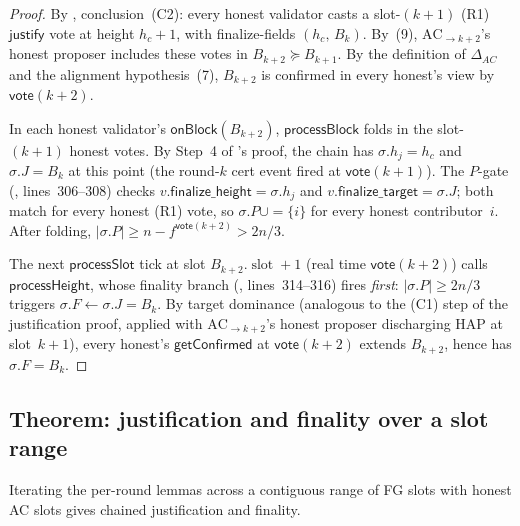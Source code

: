 \ifx\litemode\undefined\documentclass{article}\fi
\newcommand{\slot}[0]{\ensuremath{\operatorname{\mathrm{slot}}}}
\newcommand{\just}{\ensuremath{\mathsf{justify}}\xspace}
\newcommand{\finalizeHeight}{\mathsf{finalize\_height}}
\newcommand{\finalizeTarget}{\mathsf{finalize\_target}}
\newcommand{\vote}{\mathsf{vote}}
\newcommand{\processSlot}{\textsf{processSlot}\xspace}
\newcommand{\processBlock}{\textsf{processBlock}\xspace}
\newcommand{\processHeight}{\textsf{processHeight}\xspace}
\newcommand{\onBlock}{\textsf{onBlock}\xspace}
\newcommand{\getConfirmed}{\textsf{getConfirmed}\xspace}
\theoremstyle{plain}
\theoremstyle{definition}
\theoremstyle{remark}
\begin{document}
\begin{proof}
By , conclusion~\mbox{(C2)}: every honest validator casts a slot-$(k+1)$ \mbox{(R1)} \just vote at height $h_c + 1$, with finalize-fields $(h_c,\, B_k)$. By~(9), $\mathrm{AC}_{\to k+2}$'s honest proposer includes these votes in $B_{k+2} \succeq B_{k+1}$. By the definition of $\Delta_{AC}$ and the alignment hypothesis~(7), $B_{k+2}$ is confirmed in every honest's view by $\vote(k+2)$.

In each honest validator's $\onBlock(B_{k+2})$, $\processBlock$ folds in the slot-$(k+1)$ honest votes. By Step~4 of 's proof, the chain has $\sigma.h_j = h_c$ and $\sigma.J = B_k$ at this point (the round-$k$ cert event fired at $\vote(k+1)$). The $P$-gate (, lines~306--308) checks $v.\finalizeHeight = \sigma.h_j$ and $v.\finalizeTarget = \sigma.J$; both match for every honest \mbox{(R1)} vote, so $\sigma.P \cup= \{i\}$ for every honest contributor~$i$. After folding, $|\sigma.P| \geq n - f^{\vote(k+2)} > 2n/3$.

The next $\processSlot$ tick at slot $B_{k+2}.\slot + 1$ (real time $\vote(k+2)$) calls $\processHeight$, whose finality branch (, lines~314--316) fires \emph{first}: $|\sigma.P| \geq 2n/3$ triggers $\sigma.F \gets \sigma.J = B_k$. By target dominance (analogous to the (C1) step of the justification proof, applied with $\mathrm{AC}_{\to k+2}$'s honest proposer discharging HAP at slot~$k+1$), every honest's $\getConfirmed$ at $\vote(k+2)$ extends $B_{k+2}$, hence has $\sigma.F = B_k$.
\end{proof}

\subsection{Theorem: justification and finality over a slot range}\label{rev:subsec:per-round-theorem}

Iterating the per-round lemmas across a contiguous range of FG slots with honest AC slots gives chained justification and finality.
\end{document}
